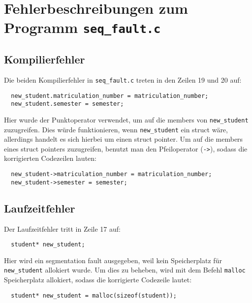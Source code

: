 \documentclass[accentcolor=tud9b]{tudreport}
\begin{document}
 \chapter*{Fehlerbeschreibungen zum Programm \texttt{seq\_fault.c}}
 \section*{Kompilierfehler}
 Die beiden Kompilierfehler in \texttt{seq\_fault.c} treten in den Zeilen 19 und 20 auf:
 \begin{lstlisting}
  new_student.matriculation_number = matriculation_number;
  new_student.semester = semester;
 \end{lstlisting}
 Hier wurde der Punktoperator verwendet, um auf die members von \texttt{new\_student} zuzugreifen. Dies würde funktionieren, wenn \texttt{new\_student} ein struct wäre, allerdings handelt es sich hierbei um einen struct pointer. Um auf die members eines struct pointers zuzugreifen, benutzt man den Pfeiloperator (\texttt{->}), sodass die korrigierten Codezeilen lauten:
 \begin{lstlisting}
  new_student->matriculation_number = matriculation_number;
  new_student->semester = semester;
 \end{lstlisting}

 \section*{Laufzeitfehler}
 Der Laufzeitfehler tritt in Zeile 17 auf:
 \begin{lstlisting}
  student* new_student;
 \end{lstlisting}
 Hier wird ein segmentation fault ausgegeben, weil kein Speicherplatz für \texttt{new\_student} allokiert wurde. Um dies zu beheben, wird mit dem Befehl \texttt{malloc} Speicherplatz allokiert, sodass die korrigierte Codezeile lautet:
 \begin{lstlisting}
  student* new_student = malloc(sizeof(student));
 \end{lstlisting}
\end{document}
